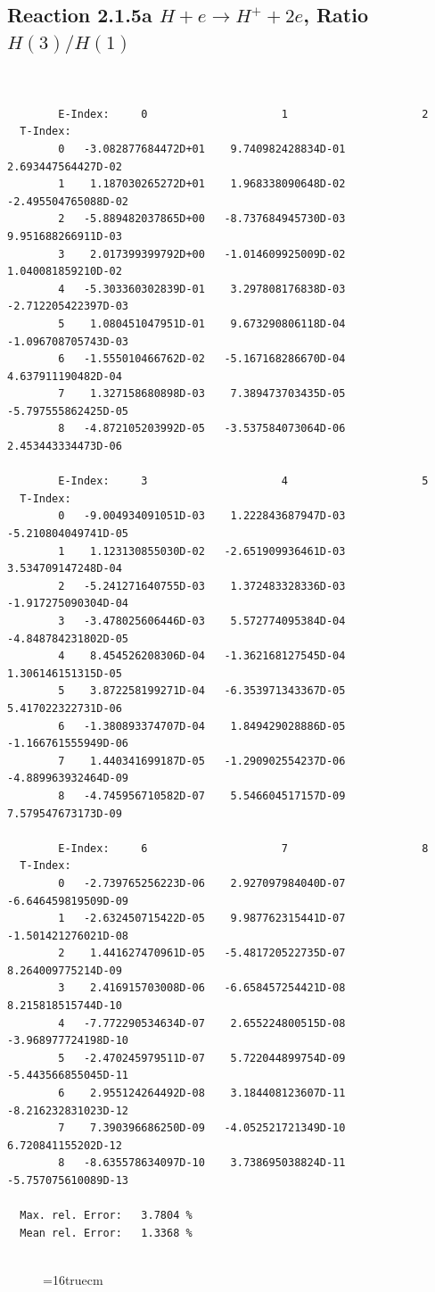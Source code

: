 \documentclass[12pt,dvips]{article}
\begin{document}
\subsection{
Reaction 2.1.5a  $H + e \rightarrow H^+ + 2e $, Ratio $H(3)/H(1)$
}

\begin{small}\begin{verbatim}


        E-Index:     0                     1                     2
  T-Index:
        0   -3.082877684472D+01    9.740982428834D-01    2.693447564427D-02
        1    1.187030265272D+01    1.968338090648D-02   -2.495504765088D-02
        2   -5.889482037865D+00   -8.737684945730D-03    9.951688266911D-03
        3    2.017399399792D+00   -1.014609925009D-02    1.040081859210D-02
        4   -5.303360302839D-01    3.297808176838D-03   -2.712205422397D-03
        5    1.080451047951D-01    9.673290806118D-04   -1.096708705743D-03
        6   -1.555010466762D-02   -5.167168286670D-04    4.637911190482D-04
        7    1.327158680898D-03    7.389473703435D-05   -5.797555862425D-05
        8   -4.872105203992D-05   -3.537584073064D-06    2.453443334473D-06

        E-Index:     3                     4                     5
  T-Index:
        0   -9.004934091051D-03    1.222843687947D-03   -5.210804049741D-05
        1    1.123130855030D-02   -2.651909936461D-03    3.534709147248D-04
        2   -5.241271640755D-03    1.372483328336D-03   -1.917275090304D-04
        3   -3.478025606446D-03    5.572774095384D-04   -4.848784231802D-05
        4    8.454526208306D-04   -1.362168127545D-04    1.306146151315D-05
        5    3.872258199271D-04   -6.353971343367D-05    5.417022322731D-06
        6   -1.380893374707D-04    1.849429028886D-05   -1.166761555949D-06
        7    1.440341699187D-05   -1.290902554237D-06   -4.889963932464D-09
        8   -4.745956710582D-07    5.546604517157D-09    7.579547673173D-09

        E-Index:     6                     7                     8
  T-Index:
        0   -2.739765256223D-06    2.927097984040D-07   -6.646459819509D-09
        1   -2.632450715422D-05    9.987762315441D-07   -1.501421276021D-08
        2    1.441627470961D-05   -5.481720522735D-07    8.264009775214D-09
        3    2.416915703008D-06   -6.658457254421D-08    8.215818515744D-10
        4   -7.772290534634D-07    2.655224800515D-08   -3.968977724198D-10
        5   -2.470245979511D-07    5.722044899754D-09   -5.443566855045D-11
        6    2.955124264492D-08    3.184408123607D-11   -8.216232831023D-12
        7    7.390396686250D-09   -4.052521721349D-10    6.720841155202D-12
        8   -8.635578634097D-10    3.738695038824D-11   -5.757075610089D-13

  Max. rel. Error:   3.7804 %
  Mean rel. Error:   1.3368 %


\end{verbatim}\end{small}
\begin{figure} \label{2.1.5a}
\epsfxsize=16truecm
\end{figure}
\end{document}

